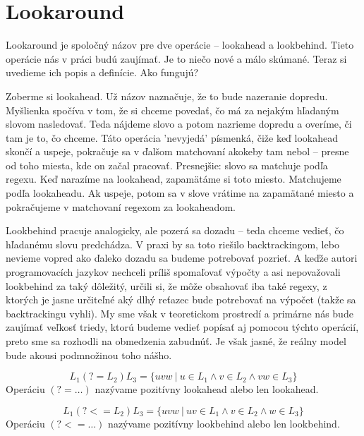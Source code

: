 \section{Lookaround}
\label{dflookaround}

Lookaround je spoločný názov pre dve operácie -- lookahead a lookbehind. Tieto operácie nás v práci budú zaujímať. Je to niečo nové a málo skúmané. Teraz si uvedieme ich popis a definície. Ako fungujú? 

Zoberme si lookahead. Už názov naznačuje, že to bude nazeranie dopredu. Myšlienka spočíva v tom, že si chceme povedať, čo má za nejakým hľadaným slovom nasledovať. Teda nájdeme slovo a potom nazrieme dopredu a overíme, či tam je to, čo chceme. Táto operácia 'nevyjedá' písmenká, čiže keď lookahead skončí a uspeje, pokračuje sa v ďalšom matchovaní akokeby tam nebol -- presne od toho miesta, kde on začal pracovať. Presnejšie: slovo sa matchuje podľa regexu. Keď narazíme na lookahead, zapamätáme si toto miesto. Matchujeme podľa lookaheadu. Ak uspeje, potom sa v slove vrátime na zapamätané miesto a pokračujeme v matchovaní regexom za lookaheadom.

Lookbehind pracuje analogicky, ale pozerá sa dozadu -- teda chceme vedieť, čo hľadanému slovu predchádza. V praxi by sa toto riešilo backtrackingom, lebo nevieme vopred ako ďaleko dozadu sa budeme potrebovať pozrieť. A keďže autori programovacích jazykov nechceli príliš spomaľovať výpočty a asi nepovažovali lookbehind za taký dôležitý, určili si, že môže obsahovať iba také regexy, z ktorých je jasne určiteľné aký dlhý reťazec bude potrebovať na výpočet (takže sa backtrackingu vyhli). My sme však v teoretickom prostredí a primárne nás bude zaujímať veľkosť triedy, ktorú budeme vedieť popísať aj pomocou týchto operácií, preto sme sa rozhodli na obmedzenia zabudnúť. Je však jasné, že reálny model bude akousi podmnožinou toho nášho.

\begin{df}
$$ L_{1}(?=L_{2})L_{3} = \lbrace uvw ~|~ u \in L_{1} \land v \in L_{2} \land vw \in L_{3} \rbrace $$ Operáciu $(?=\dots)$ nazývame pozitívny lookahead alebo len lookahead.
\end{df}

\begin{df}
$$ L_{1}(?<=L_{2})L_{3} = \lbrace uvw ~|~ uv \in L_{1} \land v \in L_{2} \land w \in L_{3} \rbrace $$ Operáciu $(?<=\dots)$ nazývame pozitívny lookbehind alebo len lookbehind.
\end{df}

